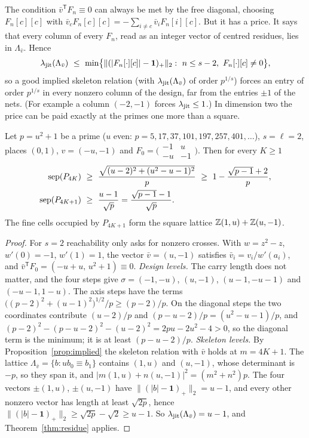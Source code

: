 The condition $\bar v^{\mathsf T}F_n\equiv0$ can always be met by the free diagonal, choosing $F_n[c][c]$ with $\bar v_cF_n[c][c]=-\sum_{i\ne c}\bar v_iF_n[i][c]$. But it has a price. It says that every column of every $F_n$, read as an integer vector of centred residues, lies in $\Lambda_{\bar v}$. Hence
\[
\ljit(\Lambda_{\bar v})\ \le\ \min\bigl\{\|(|F_n[\cdot][c]|-\mathbf 1)_+\|_2:\ n\le s-2,\ F_n[\cdot][c]\ne0\bigr\},
\]
so a good implied skeleton relation (with $\lambda_{\mathrm{jit}}(\Lambda_{\bar v})$ of order $p^{1/s}$) forces an entry of order $p^{1/s}$ in every nonzero column of the design, far from the entries $\pm1$ of the nets. (For example a column $(-2,-1)$ forces $\lambda_{\mathrm{jit}}\le1$.) In dimension two the price can be paid exactly at the primes one more than a square.

\begin{corollary}\label{cor:gauss}
Let $p=u^2+1$ be a prime ($u$ even: $p=5,17,37,101,197,257,401,\dots$), $s=\ell=2$, places $(0,1)$, $v=(-u,-1)$ and $F_0=\bigl(\begin{smallmatrix}-1&u\\-u&-1\end{smallmatrix}\bigr)$. Then for every $K\ge1$
\[
\begin{aligned}
\sep{P_{4K}}&\ \ge\ \frac{\sqrt{(u-2)^2+(u^2-u-1)^2}}p\ \ge\ 1-\frac{\sqrt{p-1}+2}p,\\
\sep{P_{4K+1}}&\ \ge\ \frac{u-1}{\sqrt p}=\frac{\sqrt{p-1}-1}{\sqrt p}.
\end{aligned}
\]
The fine cells occupied by $P_{4K+1}$ form the square lattice $\mathbb{Z}(1,u)+\mathbb{Z}(u,-1)$.
\end{corollary}

\begin{proof}
For $s=2$ reachability only asks for nonzero crosses. With $w=z^2-z$, $w'(0)=-1$, $w'(1)=1$, the vector $\bar v=(u,-1)$ satisfies $\bar v_i=v_i/w'(a_i)$, and $\bar v^{\mathsf T}F_0=(-u+u,\,u^2+1)\equiv0$. \emph{Design levels.} The carry length does not matter, and the four steps give $\sigma=(-1,-u)$, $(u,-1)$, $(u-1,-u-1)$ and $(-u-1,1-u)$. The axis steps have the terms $\bigl((p-2)^2+(u-1)^2\bigr)^{1/2}/p\ge(p-2)/p$. On the diagonal steps the two coordinates contribute $(u-2)/p$ and $(p-u-2)/p=(u^2-u-1)/p$, and $(p-2)^2-(p-u-2)^2-(u-2)^2=2pu-2u^2-4>0$, so the diagonal term is the minimum; it is at least $(p-u-2)/p$. \emph{Skeleton levels.} By Proposition~\ref{prop:implied} the skeleton relation with $\bar v$ holds at $m=4K+1$. The lattice $\Lambda_{\bar v}=\{b:ub_0\equiv b_1\}$ contains $(1,u)$ and $(u,-1)$, whose determinant is $-p$, so they span it, and $|m(1,u)+n(u,-1)|^2=(m^2+n^2)p$. The four vectors $\pm(1,u)$, $\pm(u,-1)$ have $\|(|b|-\mathbf 1)_+\|_2=u-1$, and every other nonzero vector has length at least $\sqrt{2p}$, hence $\|(|b|-\mathbf 1)_+\|_2\ge\sqrt{2p}-\sqrt2\ge u-1$. So $\lambda_{\mathrm{jit}}(\Lambda_{\bar v})=u-1$, and Theorem~\ref{thm:residue} applies.
\end{proof}

